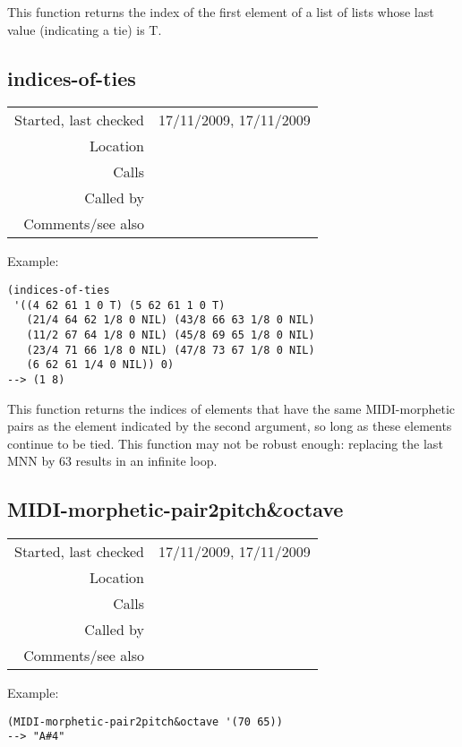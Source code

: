 \noindent This function returns the index of the first
element of a list of lists whose last value
(indicating a tie) is T.


\subsection*{indices-of-ties}\label{fun:indices-of-ties}

\vspace{0.3cm}
\begin{tabular}{r|p{8cm}}
Started, last checked & 17/11/2009, 17/11/2009 \\
Location & \nameref{sec:director-musices} \\
Calls & \\
Called by & \nameref{fun:resolve-tie} \\
Comments/see also &
\end{tabular}

\vspace{0.5cm}
\noindent Example:
\begin{verbatim}
(indices-of-ties
 '((4 62 61 1 0 T) (5 62 61 1 0 T)
   (21/4 64 62 1/8 0 NIL) (43/8 66 63 1/8 0 NIL)
   (11/2 67 64 1/8 0 NIL) (45/8 69 65 1/8 0 NIL)
   (23/4 71 66 1/8 0 NIL) (47/8 73 67 1/8 0 NIL)
   (6 62 61 1/4 0 NIL)) 0)
--> (1 8)
\end{verbatim}

\noindent This function returns the indices of
elements that have the same MIDI-morphetic pairs as
the element indicated by the second argument, so long
as these elements continue to be tied. This function
may not be robust enough: replacing the last MNN by 63
results in an infinite loop.


\subsection*{MIDI-morphetic-pair2pitch\&octave}\label{fun:MIDI-morphetic-pair2pitch-and-octave}

\vspace{0.3cm}
\begin{tabular}{r|p{8cm}}
Started, last checked & 17/11/2009, 17/11/2009 \\
Location & \nameref{sec:director-musices} \\
Calls & \\
Called by & \\
Comments/see also &
\end{tabular}

\vspace{0.5cm}
\noindent Example:
\begin{verbatim}
(MIDI-morphetic-pair2pitch&octave '(70 65))
--> "A#4"
\end{verbatim}

